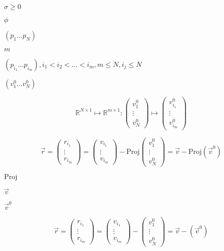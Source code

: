 \documentclass{article}
\begin{document}
$\sigma \ge 0$
\pagebreak

$\phi$
\pagebreak

$ \left(p_1 \dots p_N \right)$
\pagebreak

$m$
\pagebreak

$ \left( p_{i_1} \dots p_{i_m} \right), i_1 < i_2 < \dots < i_m, m \le N, i_j \le N$
\pagebreak

$ \left(v^0_1 \dots v^0_N \right)$
\pagebreak

\[ \mathbb{R}^{N \times 1} \mapsto \mathbb{R}^{m \times 1} : \left( \begin{array}{c} v_1^0 \\ \vdots \\ v_N^0 \end{array} \right) \mapsto \left( \begin{array}{c} v_{i_1}^0 \\ \vdots \\ v_{i_m}^0 \end{array} \right) \]
\pagebreak

\[ \vec{r} = \left( \begin{array}{c} r_{i_1} \\ \vdots \\ r_{i_m} \end{array} \right) = \left( \begin{array}{c} v_{i_1} \\ \vdots \\ v_{i_m} \end{array} \right) - \mathrm{Proj} \left( \begin{array}{c} v^0_{1} \\ \vdots \\ v^0_{N} \end{array} \right) = \vec{v} - \mathrm{Proj} \left( \vec{v}^0 \right) \]
\pagebreak

$\mathrm{Proj}$
\pagebreak

$\vec{v}$
\pagebreak

$\vec{v}^0$
\pagebreak

\[ \vec{r} = \left( \begin{array}{c} r_{i_1} \\ \vdots \\ r_{i_m} \end{array} \right) = \left( \begin{array}{c} v_{i_1} \\ \vdots \\ v_{i_m} \end{array} \right) - \left( \begin{array}{c} v^0_{1} \\ \vdots \\ v^0_{N} \end{array} \right) = \vec{v} - \left( \vec{v}^0 \right) \]
\pagebreak
\end{document}
